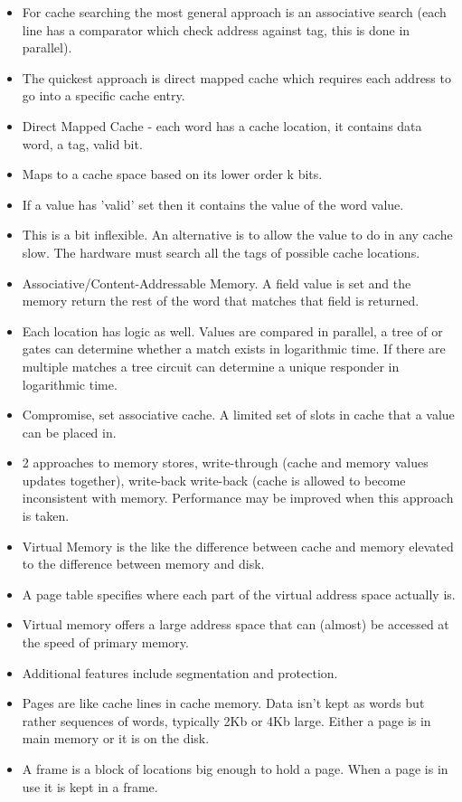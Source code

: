 \documentclass{article}
\begin{document}
\begin{itemize}
\item For cache searching the most general approach is an associative search (each line has a comparator which check address against tag, this is done in parallel).
\item The quickest approach is direct mapped cache which requires each address to go into a specific cache entry.
\item Direct Mapped Cache - each word has a cache location, it contains data word, a tag, valid bit.
\item Maps to a cache space based on its lower order k bits.
\item If a value has 'valid' set then it contains the value of the word value.
\item This is a bit inflexible. An alternative is to allow the value to do in any cache slow. The hardware must search all the tags of possible cache locations.
\item Associative/Content-Addressable Memory. A field value is set and the memory return the rest of the word that matches that field is returned.
\item Each location has logic as well. Values are compared in parallel, a tree of or gates can determine whether a match exists in logarithmic time. If there are multiple matches a tree circuit can determine a unique responder in logarithmic time.
\item Compromise, set associative cache. A limited set of slots in cache that a value can be placed in.
\item 2 approaches to memory stores, write-through (cache and memory values updates together), write-back  write-back (cache is allowed to become inconsistent with memory. Performance may be improved when this approach is taken.
\item Virtual Memory is the like the difference between cache and memory elevated to the difference between memory and disk.
\item A page table specifies where each part of the virtual address space actually is.
\item Virtual memory offers a large address space that can (almost) be accessed at the speed of primary memory.
\item Additional features include segmentation and protection.
\item Pages are like cache lines in cache memory. Data isn't kept as words but rather sequences of words, typically 2Kb or 4Kb large. Either a page is in main memory or it is on the disk.
\item A frame is a block of locations big enough to hold a page. When a page is in use it is kept in a frame.

\end{itemize}
\end{document}
